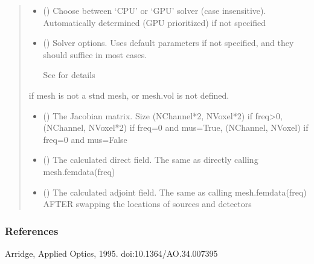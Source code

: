 \documentclass[letterpaper,10pt,english]{sphinxmanual}
\begin{document}
\begin{fulllineitems}
\begin{quote}
\begin{description}
\begin{itemize}
\item {} 
\sphinxAtStartPar
{} (\sphinxstyleliteralemphasis{\sphinxupquote{, }}) \textendash{} Choose between ‘CPU’ or ‘GPU’ solver (case insensitive). Automatically determined (GPU prioritized) if not specified

\item {} 
\sphinxAtStartPar
{} ({\hyperref[\detokenize{_autosummary/nirfasterff.utils.SolverOptions:nirfasterff.utils.SolverOptions}]{}}\sphinxstyleliteralemphasis{\sphinxupquote{, }}) \textendash{} 
\sphinxAtStartPar
Solver options. Uses default parameters if not specified, and they should suffice in most cases.

\sphinxAtStartPar
See {\hyperref[\detokenize{_autosummary/nirfasterff.utils.SolverOptions:nirfasterff.utils.SolverOptions}]{}} for details


\end{itemize}

\sphinxAtStartPar
{} \textendash{} if mesh is not a stnd mesh, or mesh.vol is not defined.

\sphinxAtStartPar
\begin{itemize}
\item {} 
\sphinxAtStartPar
{} () \textendash{} The Jacobian matrix. Size (NChannel*2, NVoxel*2) if freq\textgreater{}0, (NChannel, NVoxel*2) if freq=0 and mus=True, (NChannel, NVoxel) if freq=0 and mus=False

\item {} 
\sphinxAtStartPar
{} () \textendash{} The calculated direct field. The same as directly calling mesh.femdata(freq)

\item {} 
\sphinxAtStartPar
{} () \textendash{} The calculated adjoint field. The same as calling mesh.femdata(freq) AFTER swapping the locations of sources and detectors

\end{itemize}


\end{description}\end{quote}
\subsubsection*{References}

\sphinxAtStartPar
Arridge, Applied Optics, 1995. doi:10.1364/AO.34.007395

\end{fulllineitems}
\end{document}
